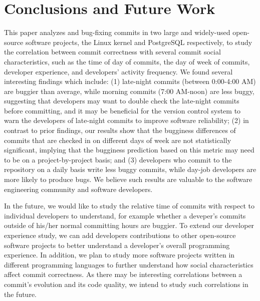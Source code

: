 \section{Conclusions and Future Work}
\label{sec-conclusion}

This paper analyzes \linuxBFC and \postBFC bug-fixing commits in two large and widely-used open-source software projects, 
the Linux kernel and PostgreSQL respectively, to study the correlation between commit correctness with 
several commit social characteristics, such as the time of day of commits,
the day of week of commits, developer experience, and developers' activity
frequency. We found several interesting findings which include: (1)  
late-night commits (between 0:00-4:00 AM) are buggier than average, 
while morning commits (7:00 AM-noon) are less buggy, suggesting 
that developers may want to double check the late-night commits before committing, 
and it may be beneficial for the version control
system to warn the developers of late-night commits to improve software reliability; 
(2) in contrast to prior findings, 
our results show that the bugginess differences of commits that are checked in on different days of week 
are not statistically significant, 
implying that the bugginess prediction based on this 
metric may need to be on a project-by-project basis;
and (3) developers who commit to the repository on a daily basis
write less buggy commits, while day-job developers are more likely to produce
bugs.
%
We believe such results are valuable to the software engineering community and 
software developers. 

In the future, we would like to study the relative time of commits with respect to individual developers to 
understand, for example whether a deveper's commits outside of his/her normal committing hours are buggier.
To extend our developer experience study, we can add developers contributions to other open-source software projects
to better understand a developer's overall programming experience. 
In addition, we plan to study more software projects written in different programming languages
to further understand how social characteristics affect commit correctness. 
As there may be interesting correlations between a commit's evolution and its code quality,
we intend to study such correlations in the future.


